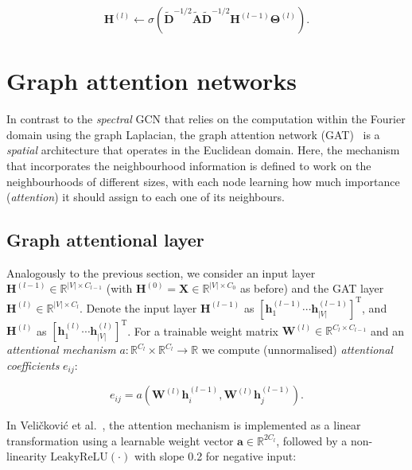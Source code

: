 \begin{equation}
    \mathbf{H}^{(l)} \leftarrow \sigma( \mathbf{\tilde{D}}^{-1/2}\mathbf{\tilde{A}}\mathbf{\tilde{D}}^{-1/2}\mathbf{H}^{(l-1)}\mathbf{\Theta}^{(l)}).
\end{equation}

\section{Graph attention networks}
\label{training-gat}

In contrast to the \textit{spectral} GCN that relies on the computation within the Fourier domain using the graph Laplacian, the graph attention network (GAT)~\cite{velickovic2018graph} is a \textit{spatial} architecture that operates in the Euclidean domain. Here, the mechanism that incorporates the neighbourhood information is defined to work on the neighbourhoods of different sizes, with each node learning how much importance (\textit{attention}) it should assign to each one of its neighbours.


\subsection{Graph attentional layer}
Analogously to the previous section, we consider an input layer $\mathbf{H}^{(l-1)} \in \mathbb{R}^{|V|\times C_{l-1}}$ (with $\mathbf{H}^{(0)} = \mathbf{X} \in \mathbb{R}^{|V|\times C_{0}}$ as before) and the GAT layer $\mathbf{H}^{(l)} \in \mathbb{R}^{|V|\times C_{l}}$. Denote the input layer $\mathbf{H}^{(l-1)}$ as $[\mathbf{h}_1^{(l-1)} \cdots \mathbf{h}_{|V|}^{(l-1)}]^{\mathrm{T}}$, and $\mathbf{H}^{(l)}$ as $[\mathbf{h}_1^{(l)} \cdots \mathbf{h}_{|V|}^{(l)}]^{\mathrm{T}}$. For a trainable weight matrix $\mathbf{W}^{(l)} \in \mathbb{R}^{C_{l} \times C_{l-1}}$ and an \textit{attentional mechanism} $a: \mathbb{R}^{C_{l}} \times \mathbb{R}^{C_{l}} \rightarrow \mathbb{R}$ we compute (unnormalised) \textit{attentional coefficients} $e_{ij}$:

\begin{equation}
    e_{ij} = a(\mathbf{W}^{(l)}\mathbf{h}_i^{(l-1)}, \mathbf{W}^{(l)}\mathbf{h}_j^{(l-1)}).
\end{equation}

In Veli{\v{c}}kovi\'{c} et al.~\cite{velickovic2018graph}, the attention mechanism is implemented as a linear transformation using a learnable weight vector $\mathbf{a} \in \mathbb{R}^{2C_{l}}$, followed by a non-linearity $\mathrm{LeakyReLU}(\cdot)$ with slope 0.2 for negative input:

